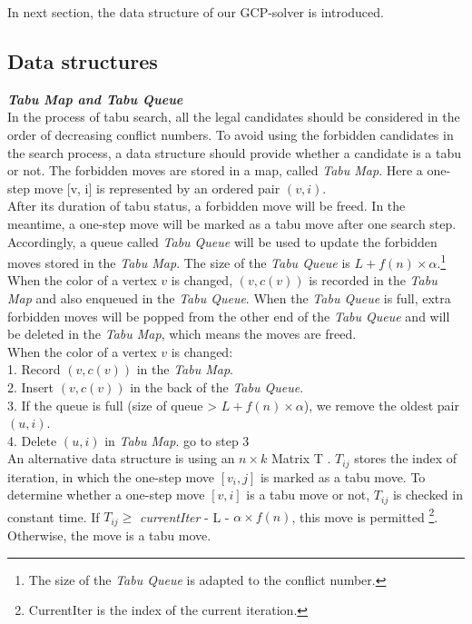 \documentclass[12pt,a4paper,twoside]{scrartcl}
\numberwithin{equation}{section}
\begin{document}
In next section, the data structure of our GCP-solver is introduced.
\clearpage
\subsection{Data structures}
\label{subsec:Data structures}
\emph{\textbf{Tabu Map and Tabu Queue}}\\
 In the process of tabu search, all the legal candidates should be considered in the order of decreasing conflict numbers. To avoid using the forbidden candidates in the search process, a data structure should provide whether a candidate is a tabu or not. The forbidden moves are stored in a map, called \emph{Tabu Map}. Here a one-step move [v, i] is represented by an ordered pair $(v, i) $.\\
After its duration of tabu status, a  forbidden move will be freed. In the meantime, a one-step move will be marked as a tabu move after one search step. Accordingly, a queue called \emph{Tabu Queue} will be used to update the forbidden moves stored in the \emph{Tabu Map}. The size of the \emph{Tabu Queue} is $L+ f(n)\times \alpha$.\footnote{The size of the \emph{Tabu Queue} is adapted to the conflict number.}
When the color of a vertex $v$ is changed, $(v,c(v))$ is recorded in the  \emph{Tabu Map} and also enqueued in the \emph{Tabu Queue}. When the \emph{Tabu Queue} is full, extra forbidden moves  will be popped from the other end of the \emph{Tabu Queue} and will be deleted in the \emph{Tabu Map}, which means the moves are freed.\\

When the color of a vertex $v$ is changed: \\
1. Record $(v, c(v))$ in the \emph{Tabu Map}.\\
2. Insert $(v, c(v))$ in the back of the \emph{Tabu Queue}.\\
3. If the queue is full (size of queue > $L+ f(n) \times\alpha$), we remove the oldest pair $(u,i)$.\\
4. Delete $(u, i)$ in \emph{Tabu Map}. go to step 3\\

An alternative data structure is using an $n \times k $ Matrix T                      \cite{galinier2006survey}. $T_{ij}$ stores the index of iteration, in which the one-step move $[v_i, j]$ is marked as a tabu move. To determine whether a one-step move $[v, i]$ is a tabu move or not, $T_{ij}$ is checked in constant time. If $T_{ij}\geq $ \emph{currentIter} - L - $\alpha \times f(n)$, this move is permitted \footnote{CurrentIter is the index of the current iteration.}. Otherwise, the move is a tabu move.\\
\end{document}
